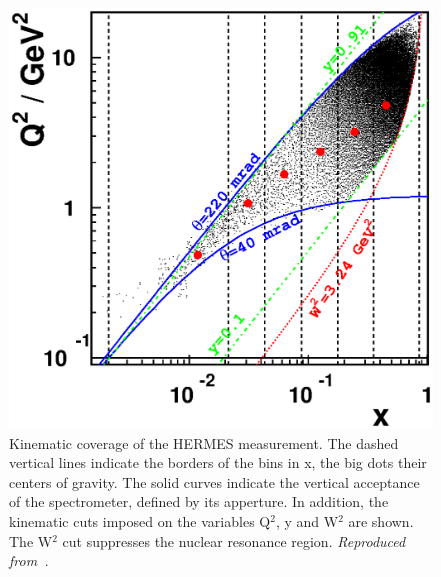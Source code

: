 \begin{figure}
\begin{center}
\includegraphics[angle=0,width=4.in]{figs/kineplane.eps}
\caption{\label{HERMES_KIN} Kinematic coverage of the HERMES measurement.  The dashed vertical lines indicate the borders 
of the bins in x, the big dots their centers of gravity. The solid curves 
indicate the 
vertical acceptance of the spectrometer, defined by its apperture. 
In addition, the 
kinematic cuts imposed on the variables Q$^2$, y 
and W$^2$ are shown. The W$^2$
cut suppresses the nuclear resonance region. 
{\it Reproduced from~\cite{Riedl:2005jq}.}}
\end{center}\end{figure}





